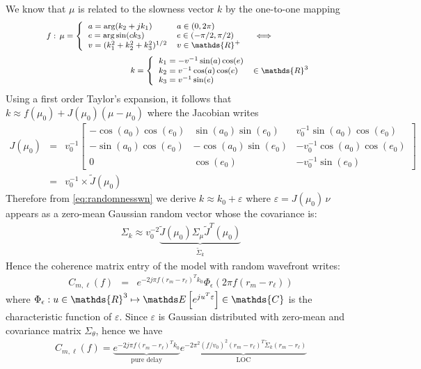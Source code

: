 We know that $\mu$ is related to the slowness vector $k$ by the one-to-one mapping 
\begin{eqnarray*}
 \label{eq:tehtaxyz}
 {\footnotesize
 \begin{array}{rcl}
 f:\,
  \mu= 
 \left\{
 \begin{array}{ll}
 a=\arg(k_{2}+jk_{1})&a\in(0,2\pi)
 \\
 e=\arg\sin(ck_{3})&e\in(-\pi/2,\pi/2)
 \\
 v=(k_{1}^{2}+k_{2}^{2}+k_{3}^{2})^{1/2}&v\in\mathds{R}^{+}
 \end{array}\right.
 &
 \Longleftrightarrow\vspace{6pt}
 \\ 
 &&\hspace{-5.5cm}
 \,k=\left\{
 \begin{array}{ll}
 k_{1}=-v^{-1}\sin(a)\cos(e)
 \\
 k_{2}=v^{-1}\cos(a)\cos(e)&\in\mathds{R}^{3}
 \\
 k_{3}=v^{-1}\sin(e) 
 \end{array}\right.
 \end{array}}
\end{eqnarray*}
Using a first order Taylor's expansion, it follows that $k \approx f(\mu_{0})+J(\mu_{0})(\mu-\mu_{0})$ where the Jacobian writes
\begin{eqnarray*}
 J(\mu_{0}) &=& 
 v_{0}^{-1}
 \begin{bmatrix}
 -\cos(a_{0})\cos(e_{0})&
 \sin(a_{0})\sin(e_{0})&
 v_{0}^{-1}\sin(a_{0})\cos(e_{0})
 \\
 -\sin(a_{0})\cos(e_{0})&
 -\cos(a_{0})\sin(e_{0})&
 -v_{0}^{-1}\cos(a_{0})\cos(e_{0})
 \\
 0& 
 \cos(e_{0})&
 -v_{0}^{-1}\sin(e_{0})
 \end{bmatrix}
\\
&=&
v_{0}^{-1} \times \tilde J(\mu_0)
\end{eqnarray*}
Therefore from \eqref{eq:randomnesswn} we derive $k\approx k_{0}+\varepsilon$ where $\varepsilon=J(\mu_{0})\,\nu$ appears as a zero-mean Gaussian random vector whose the covariance is:
\begin{eqnarray}
 \label{eq:aec2theta}
\Sigma_{k} \approx v_{0}^{-2} 
\underbrace{\tilde J(\mu_{0}) \Sigma_{\mu} \tilde J^{T}(\mu_{0})}_{\tilde \Sigma_{k}}
\end{eqnarray}
Hence the coherence matrix entry of the model with random wavefront writes:
\begin{eqnarray*}
   C_{m,\ell}(f)&=&e^{-2j\pi f(r_{m}-r_{\ell})^{T}k_{0}}
   \Phi_{\epsilon}(2\pi f(r_{m}-r_{\ell}))
\end{eqnarray*}
where $\Phi_{\epsilon}:u\in\mathds{R}^{3}\mapsto\esp{e^{ju^{T}\varepsilon}}\in\mathds{C}$ is the characteristic function of $\varepsilon$. 
Since $\varepsilon$ is Gaussian distributed with zero-mean and covariance matrix $\Sigma_{\theta}$, hence we have
\begin{eqnarray}
\label{eq:Cfr1r2Gaussian}
C_{m,\ell}(f)=
\underbrace{e^{-2j\pi f(r_{m}-r_{\ell})^{T}k_{0}}}_{\text{pure delay}}
 \underbrace{e^{-2\pi^{2}(f/v_0)^{2}(r_{m}-r_{\ell})^{T}
                 \tilde \Sigma_{k}(r_{m}-r_{\ell})}}_{\text{LOC}}
 \end{eqnarray}

